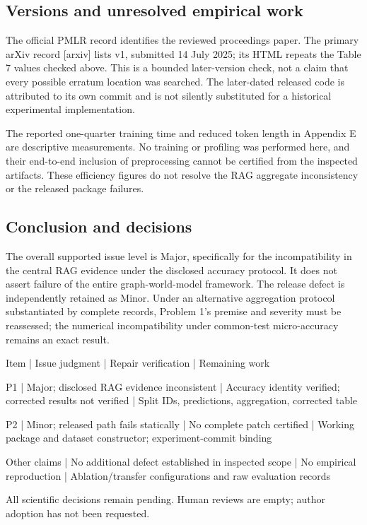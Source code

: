 \documentclass[10pt]{article}
\begin{document}
\subsection*{Versions and unresolved empirical work}
The official PMLR record identifies the reviewed proceedings paper. The primary arXiv record [arxiv] lists v1, submitted 14 July 2025; its HTML repeats the Table 7 values checked above. This is a bounded later-version check, not a claim that every possible erratum location was searched. The later-dated released code is attributed to its own commit and is not silently substituted for a historical experimental implementation.\par
The reported one-quarter training time and reduced token length in Appendix E are descriptive measurements. No training or profiling was performed here, and their end-to-end inclusion of preprocessing cannot be certified from the inspected artifacts. These efficiency figures do not resolve the RAG aggregate inconsistency or the released package failures.\par
\subsection*{Conclusion and decisions}
The overall supported issue level is Major, specifically for the incompatibility in the central RAG evidence under the disclosed accuracy protocol. It does not assert failure of the entire graph-world-model framework. The release defect is independently retained as Minor. Under an alternative aggregation protocol substantiated by complete records, Problem 1’s premise and severity must be reassessed; the numerical incompatibility under common-test micro-accuracy remains an exact result.\par
Item | Issue judgment | Repair verification | Remaining work\par
P1 | Major; disclosed RAG evidence inconsistent | Accuracy identity verified; corrected results not verified | Split IDs, predictions, aggregation, corrected table\par
P2 | Minor; released path fails statically | No complete patch certified | Working package and dataset constructor; experiment-commit binding\par
Other claims | No additional defect established in inspected scope | No empirical reproduction | Ablation/transfer configurations and raw evaluation records\par
All scientific decisions remain pending. Human reviews are empty; author adoption has not been requested.\par
\end{document}
